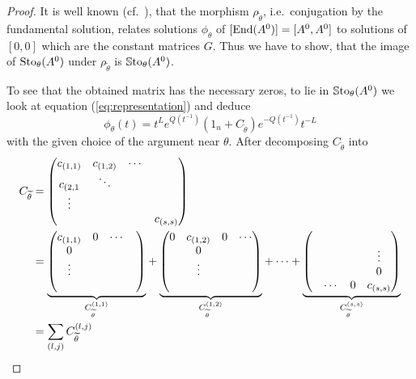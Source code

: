 \begin{proof}
  It is well known (cf.\ \cite[10]{thboalch}), that the morphism
  $\rho_{\tilde\theta}$, i.e.\ conjugation by the fundamental solution,
  relates solutions $\phi_\theta$ of $[\operatorname{End}(A^0)]=[A^0,A^0]$ to solutions of
  $[0,0]$ which are the constant matrices $G$.
  Thus we have to show, that the image of $\operatorname{Sto}_\theta(A^0)$ under
  $\rho_{\tilde\theta}$ is $\operatorname{\mathbb{S}to}_\theta(A^0)$.

  To see that the obtained matrix has the necessary zeros, to lie in
  $\operatorname{\mathbb{S}to}_{\theta}(A^0)$ we look at equation (\ref{eq:representation}) and
  deduce
  \begin{equation}\label{eq:repProof1}
    \phi_\theta(t)
    =t^L e^{Q(t^{-1})}(1_n+C_{\tilde\theta})e^{-Q(t^{-1})}t^{-L}
  \end{equation}
  with the given choice of the argument near $\theta$.
  After decomposing $C_{\tilde\theta}$ into
  \begin{align*}
    C_{\tilde\theta}&=\begin{pmatrix}
      c_{(1,1)} & c_{(1,2)} & \cdots &\\
      c_{(2,1} & \ddots\\
      \vdots \\
      & & & c_{(s,s)}
    \end{pmatrix}
  \\&=
    \underset{C_{\tilde\theta}^{(1,1)}}{\underbrace{%
      \begin{pmatrix}
        c_{(1,1)} & 0 & \cdots &\\
        0\\
        \vdots&\\
        &
      \end{pmatrix}
    }}
    +
    \underset{C_{\tilde\theta}^{(1,2)}}{\underbrace{%
      \begin{pmatrix}
        0 & c_{(1,2)} & 0 & \cdots\\
        & 0 &\\
        &\vdots\\
        &
      \end{pmatrix}
    }}
    +\cdots+
    \underset{C_{\tilde\theta}^{(s,s)}}{\underbrace{%
      \begin{pmatrix}
        &\\
        & & & \vdots\\
        & & & 0\\
        & \cdots & 0 & c_{(s,s)}
      \end{pmatrix}
    }}
  \\&=\sum_{(l,j)}C_{\tilde\theta}^{(l,j)}

\end{align*}
\end{proof}
